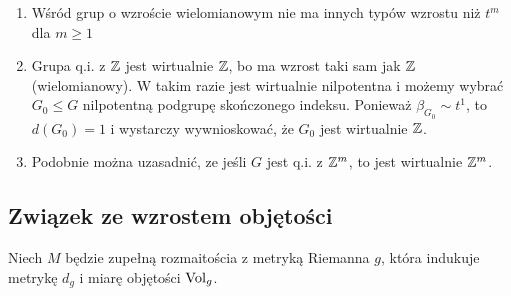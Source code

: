 \begin{conclusion}{}{}
  \begin{enumerate}
    \item Wśród grup o wzroście wielomianowym nie ma innych typów wzrostu niż $t^m$ dla $m\geq1$
    \item Grupa q.i. z $\mathbb{Z}$ jest wirtualnie $\mathbb{Z}$, bo ma wzrost taki sam jak $\mathbb{Z}$ (wielomianowy). W takim razie jest wirtualnie nilpotentna i możemy wybrać $G_0\leq G$ nilpotentną podgrupę skończonego indeksu. Ponieważ $\beta_{G_0}\sim t^1$, to $d(G_0)=1$ i wystarczy wywnioskować, że $G_0$ jest wirtualnie $\mathbb{Z}$.
    \item Podobnie można uzasadnić, ze jeśli $G$ jest q.i. z $\mathbb{Z}^m$, to jest wirtualnie $\mathbb{Z}^m$.
  \end{enumerate}
\end{conclusion}

\subsection{Związek ze wzrostem objętości}

\begin{definition}{}{}
  Niech $M$ będzie zupełną rozmaitościa z metryką Riemanna $g$, która indukuje metrykę $d_g$ i miarę objętości $\operatorname{Vol}_g$.
\end{definition}




